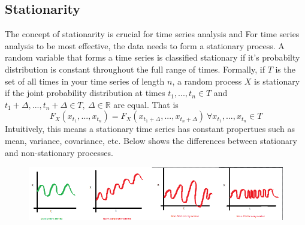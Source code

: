 \documentclass{article}
\begin{document}
  \subsection{Stationarity}
  The concept of stationarity is crucial for time series analysis and  For time series analysis to be most effective, the data needs to form a stationary process. 
  A random variable that forms a time series is classified stationary if it's probabilty distribution is constant throughout the full range of times. 
  Formally, if $T$ is the set of all times in your time series of length $n$, a random process $X$ is stationary if the joint probability distribution at times $t_1,...,t_n \in T$ and $t_1+\Delta,...,t_n+\Delta \in T,\  \Delta \in \mathbb{R}$ are equal. That is
  \begin{equation*}
    F_{X}(x_{t_1},...,x_{t_n}) = F_{X}(x_{{t_1}+\Delta},...,x_{{t_n}+\Delta})\ \forall x_{t_1},...,x_{t_n} \in T
  \end{equation*}
  Intuitively, this means a stationary time series has constant propertues such as mean, variance, covariance, etc. Below shows the differences between stationary and non-stationary processes.
  \begin{figure}[H]
    \hspace*{-2cm}
    \includegraphics[scale=0.8]{stationary_time_series.png}
  \end{figure}
\end{document}
